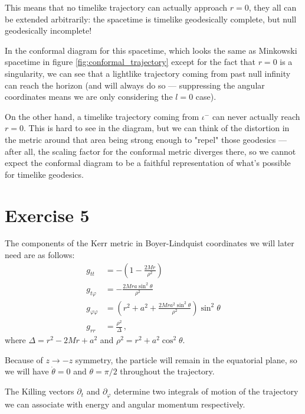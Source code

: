 \documentclass[main.tex]{subfiles}
\begin{document}
This means that no timelike trajectory can actually approach \(r = 0\), they all can be extended arbitrarily: the spacetime is timelike geodesically complete, but null geodesically incomplete! 

In the conformal diagram for this spacetime, which looks the same as Minkowski spacetime in figure \ref{fig:conformal_trajectory} except for the fact that \(r = 0\) is a singularity, we can see that a lightlike trajectory coming from past null infinity can reach the horizon (and will always do so --- suppressing the angular coordinates means we are only considering the \(l = 0\) case).

On the other hand, a timelike trajectory coming from \(\iota^-\) can never actually reach \(r = 0\). 
This is hard to see in the diagram, but we can think of the distortion in the metric around that area being strong enough to "repel" those geodesics --- after all, the scaling factor for the conformal metric diverges there, so we cannot expect the conformal diagram to be a faithful representation of what's possible for timelike geodesics.

\section*{Exercise 5}

The components of the Kerr metric in Boyer-Lindquist coordinates we will later need are as follows: 
%
\begin{align}
g_{tt} &= - \left(1 - \frac{2Mr}{\rho^2}\right)  \\
g_{t \varphi } &= - \frac{2 M r a \sin^2 \theta }{\rho^2}  \\
g_{\varphi \varphi } &=  \left( r^2 + a^2 + \frac{2 M r a^2 \sin^2 \theta }{\rho^2} \right) \sin^2 \theta  \\
g_{rr} &= \frac{\rho^2}{\Delta }
\,,
\end{align}
%
where \(\Delta = r^2 - 2Mr + a^2\) and \(\rho^2 = r^2 + a^2 \cos^2 \theta \).

Because of \(z \to -z\) symmetry, the particle will remain in the equatorial plane, so we will have \(\dot{\theta} = 0\) and \(\theta = \pi /2\) throughout the 
trajectory.

The Killing vectors \(\partial_t\) and \(\partial_\varphi \) determine two integrals of motion of the trajectory we can associate with energy and angular momentum respectively. 
\end{document}
